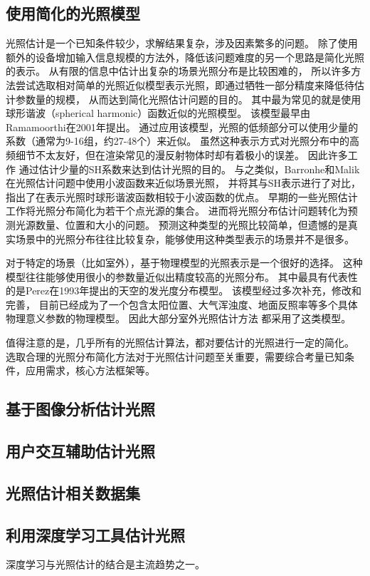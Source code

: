 \subsection{使用简化的光照模型}
光照估计是一个已知条件较少，求解结果复杂，涉及因素繁多的问题。
除了使用额外的设备增加输入信息规模的方法外，降低该问题难度的另一个思路是简化光照的表示。
从有限的信息中估计出复杂的场景光照分布是比较困难的，
所以许多方法尝试选取相对简单的光照近似模型表示光照，即通过牺牲一部分精度来降低待估计参数量的规模，
从而达到简化光照估计问题的目的。
其中最为常见的就是使用球形谐波（spherical harmonic）函数近似的光照模型。
该模型最早由Ramamoorthi\cite{ramamoorthi2001efficient}在2001年提出。
通过应用该模型，光照的低频部分可以使用少量的系数（通常为9-16组，约27-48个）来近似。
虽然这种表示方式对光照分布中的高频细节不太友好，但在渲染常见的漫反射物体时却有着极小的误差。
因此许多工作\cite{ramamoorthi2001signal,kemelmacher20113d,garrido2013reconstructing,
knorr2014real,li2014intrinsic,barron2015shape, rematas2016deep}
通过估计少量的SH系数来达到估计光照的目的。
与之类似，Barronhe和Malik\cite{okabe2004spherical}在光照估计问题中使用小波函数来近似场景光照，
并将其与SH表示进行了对比，指出了在表示光照时球形谐波函数相较于小波函数的优点。
早期的一些光照估计工作\cite{sato1999acquiring,  panagopoulos2011illumination, 
wang2002estimation, li2003multiple, sato2003illumination}将光照分布简化为若干个点光源的集合。
进而将光照分布估计问题转化为预测光源数量、位置和大小的问题。
预测这种类型的光照比较简单，但遗憾的是真实场景中的光照分布往往比较复杂，能够使用这种类型表示的场景并不是很多。

对于特定的场景（比如室外），基于物理模型的光照表示是一个很好的选择。
这种模型往往能够使用很小的参数量近似出精度较高的光照分布。
其中最具有代表性的是Perez\cite{perez1993all}在1993年提出的天空的发光度分布模型。
该模型经过多次补充，修改和完善\cite{nishita1996display, sirai1993display,
preetham1999practical,raab2008unbiased,hosek2012analytic, hovsekhovsek2013adding}，
目前已经成为了一个包含太阳位置、大气浑浊度、地面反照率等多个具体物理意义参数的物理模型。
因此大部分室外光照估计方法\cite{lalonde2008does, lalonde2010sun, lalonde2012estimating, sunkavalli2008color}
都采用了这类模型。

值得注意的是，几乎所有的光照估计算法，都对要估计的光照进行一定的简化。
选取合理的光照分布简化方法对于光照估计问题至关重要，需要综合考量已知条件，应用需求，核心方法框架等。

\subsection{基于图像分析估计光照}

\subsection{用户交互辅助估计光照}

\subsection{光照估计相关数据集}
\subsection{利用深度学习工具估计光照}

深度学习与光照估计的结合是主流趋势之一。